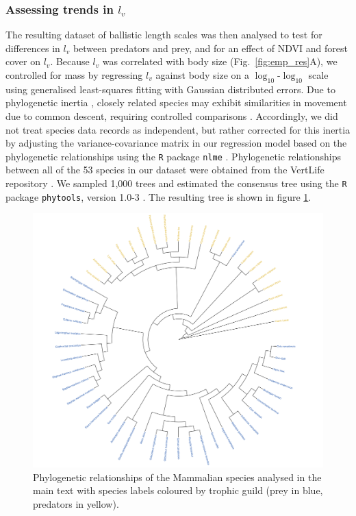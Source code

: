 \documentclass[12pt]{article}
\begin{document}
\subsubsection*{Assessing trends in $l_v$}

The resulting dataset of ballistic length scales was then analysed to test for differences in $l_v$ between predators and prey, and for an effect of NDVI and forest cover on $l_v$. Because $l_v$ was correlated with body size (Fig.~\ref{fig:emp_res}A), we controlled for mass by regressing $l_v$ against body size on a $\log_{10}$-$\log_{10}$ scale using generalised least-squares fitting with Gaussian distributed errors. Due to phylogenetic inertia \cite{Hansen:2005cg}, closely related species may exhibit similarities in movement due to common descent, requiring controlled comparisons \cite{Harvey:1991uo}. Accordingly, we did not treat species data records as independent, but rather corrected for this inertia by adjusting the variance-covariance matrix in our regression model based on the phylogenetic relationships using the \texttt{R} package \texttt{nlme} \cite{Pinheiro:2018}. Phylogenetic relationships between all of the 53 species in our dataset were obtained from the VertLife repository \cite{Upham:2019}. We sampled 1,000 trees and estimated the consensus tree using the \texttt{R} package \texttt{phytools}, version 1.0-3 \cite{Revell:2012}. The resulting tree is shown in figure \ref{fig:phylogeny}. %

\begin{figure}[!h]
\centering
\includegraphics[scale=1]{Phylogeny.png}
\caption{Phylogenetic relationships of the Mammalian species analysed in the main text with species labels coloured by trophic guild (prey in blue, predators in yellow).}
\label{fig:phylogeny}
\end{figure}
\end{document}
